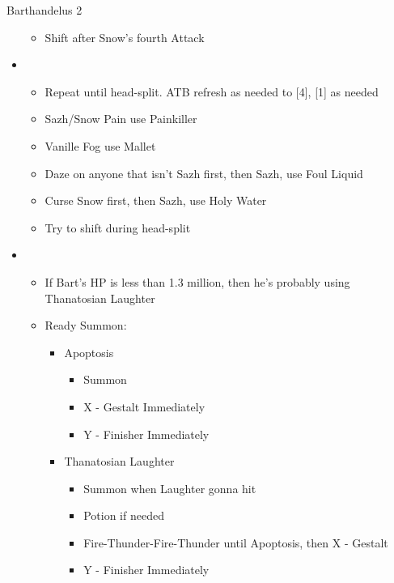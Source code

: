 \begin{paracol}{2}
\begin{battle}{Barthandelus 2}
\begin{itemize}
\begin{itemize}
				      \item Shift after Snow's fourth Attack
			      \end{itemize}
			\item \sixth
			      \begin{itemize}
				      \item Repeat until head-split. ATB refresh as needed to [4], [1] as needed
				      \item Sazh/Snow Pain use Painkiller
				      \item Vanille Fog use Mallet
				      \item Daze on anyone that isn't Sazh first, then Sazh, use Foul Liquid
				      \item Curse Snow first, then Sazh, use Holy Water
				      \item Try to shift during head-split
			      \end{itemize}
			\item \third
			      \begin{itemize}
				      \item If Bart's HP is less than 1.3 million, then he's probably using Thanatosian Laughter
				      \item Ready Summon:
				            \begin{itemize}
					            \item Apoptosis
					                  \begin{itemize}
						                  \item Summon
						                  \item X - Gestalt Immediately
						                  \item Y - Finisher Immediately
					                  \end{itemize}
					            \item Thanatosian Laughter
					                  \begin{itemize}
						                  \item Summon when Laughter gonna hit
						                  \item Potion if needed
						                  \item Fire-Thunder-Fire-Thunder until Apoptosis, then X - Gestalt
						                  \item Y - Finisher Immediately
					                  \end{itemize}
				            \end{itemize}
			      \end{itemize}

\end{itemize}
\end{battle}
\end{paracol}
